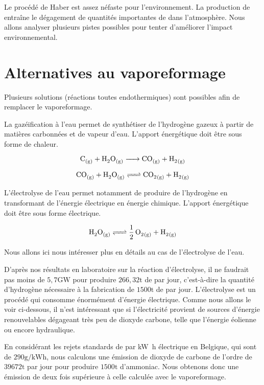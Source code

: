 \documentclass[a4paper, oneside, 12pt]{article}
\begin{document}
Le procédé de Haber est assez néfaste pour l'environnement. 
La production de  entraîne le dégagement de quantités 
importantes de  dans l'atmosphère.
Nous allons analyser plusieurs pistes possibles pour tenter 
d'améliorer l'impact environnemental.

\section*{Alternatives au vaporeformage}

Plusieurs solutions (réactions toutes endothermiques) 
sont possibles afin de remplacer le vaporeformage.

La gazéification à l'eau permet de synthétiser de l'hydrogène 
gazeux à partir de matières carbonnées et de vapeur d'eau.
L'apport énergétique doit être sous forme de chaleur.

\[ \ce{C_{(g)} + H2O_{(g)} -> CO_{(g)} + H2_{(g)}} \]

\[ \ce{CO_{(g)} + H2O_{(g)} <=> CO2_{(g)} + H2_{(g)}} \]

L'électrolyse de l'eau permet notamment de produire de l'hydrogène 
en transformant de l'énergie électrique en énergie chimique.
L'apport énergétique doit être sous forme électrique.

\[ \ce{H2O_{(g)} <=> \frac{1}{2} \, O2_{(g)} + H2_{(g)}} \]

Nous allons ici nous intéresser plus en détails au cas de l'électrolyse de l'eau. 

D'après nos résultats en laboratoire sur la réaction d'électrolyse, 
il ne faudrait pas moins de $5,7 \si{\giga\watt}$ 
pour produire $266,32\si{\tonne}$ de  par jour, 
c'est-à-dire la quantité d'hydrogène nécessaire 
à la fabrication de $1500\si{\tonne}$ de  par jour. 
L'électrolyse est un procédé qui consomme énormément d'énergie électrique. 
Comme nous allons le voir ci-dessous, il n'est intéressant que si 
l'électricité provient de sources d'énergie renouvelables dégageant 
très peu de dioxyde carbone, telle que l'énergie éolienne ou encore hydraulique.

En considérant les rejets standards de  par \si{\kilo\watt\hour} électrique 
en Belgique, qui sont de $290\si{\gram/\kilo\watt\hour}$,
nous calculons une émission de dioxyde de carbone de l'ordre de $39 672\si{\tonne}$
par jour pour produire $1500\si{\tonne}$ d'ammoniac. 
Nous obtenons donc une émission de  deux fois 
supérieure à celle calculée avec le vaporeformage.
\end{document}
